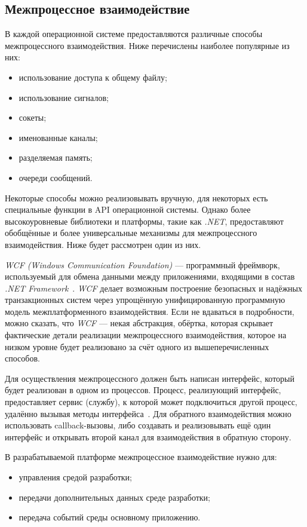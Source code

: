 \subsection{Межпроцессное взаимодействие}
\label{sec:ipc}

В каждой операционной системе предоставляются различные способы межпроцессного взаимодействия. Ниже перечислены наиболее популярные из них:
\begin{itemize}
   \item использование доступа к общему файлу;
   \item использование сигналов;
   \item сокеты;
   \item именованные каналы;
   \item разделяемая память;
   \item очереди сообщений.
\end{itemize}

Некоторые способы можно реализовывать вручную, для некоторых есть специальные функции в API операционной системы. Однако более высокоуровневые библиотеки и платформы, такие как {\it .NET}, предоставляют обобщённые и более универсальные механизмы для межпроцессного взаимодействия. Ниже будет рассмотрен один из них.

{\it WCF (Windows Communication Foundation)} --- программный фреймворк, используемый для обмена данными между приложениями, входящими в состав {\it .NET Framework}~\cite{wcf-unleashed}. {\it WCF} делает возможным построение безопасных и надёжных транзакционных систем через упрощённую унифицированную программную модель межплатформенного взаимодействия. Если не вдаваться в подробности, можно сказать, что {\it WCF} --- некая абстракция, обёртка, которая скрывает фактические детали реализации межпроцессного взаимодействия, которое на низком уровне будет реализовано за счёт одного из вышеперечисленных способов. 

Для осуществления межпроцессного должен быть написан интерфейс, который будет реализован в одном из процессов. Процесс, реализующий интерфейс, предоставляет сервис (службу), к которой может подключиться другой процесс, удалённо вызывая методы интерфейса~\cite{wcf-services}. Для обратного взаимодействия можно использовать callback-вызовы, либо создавать и реализовывать ещё один интерфейс и открывать второй канал для взаимодействия в обратную сторону. 

В разрабатываемой платформе межпроцессное взаимодействие нужно для:
\begin{itemize}
 \item управления средой разработки;
 \item передачи дополнительных данных среде разработки;
 \item передача событий среды основному приложению.
\end{itemize}


\pagebreak
